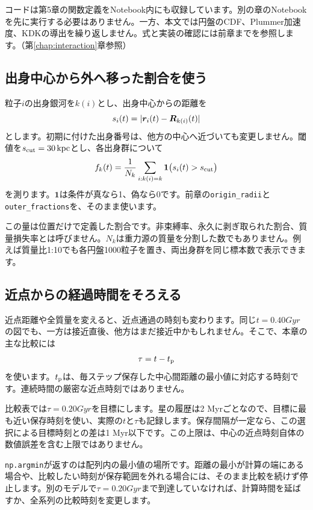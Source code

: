 コードは第5章の関数定義をNotebook内にも収録しています。別の章のNotebookを先に実行する必要はありません。一方、本文では円盤のCDF、Plummer加速度、KDKの導出を繰り返しません。式と実装の確認には前章までを参照します。（第\ref{chap:interaction}章参照）

\subsection{出身中心から外へ移った割合を使う}
粒子$i$の出身銀河を$k(i)$とし、出身中心からの距離を
\begin{equation}
 s_i(t)=|\boldsymbol r_i(t)-\boldsymbol R_{k(i)}(t)|
 \label{eq:ch6-origin-radius}
\end{equation}
とします。初期に付けた出身番号は、他方の中心へ近づいても変更しません。閾値を$s_{\rm cut}=30\,\mathrm{kpc}$とし、各出身群について
\begin{equation}
 f_k(t)=\frac{1}{N_k}\sum_{i:k(i)=k}\mathbf{1}\bigl(s_i(t)>s_{\rm cut}\bigr)
 \label{eq:ch6-fraction}
\end{equation}
を測ります。$\mathbf{1}$は条件が真なら1、偽なら0です。前章の\texttt{origin\_radii}と\texttt{outer\_fractions}を、そのまま使います。

この量は位置だけで定義した割合です。非束縛率、永久に剥ぎ取られた割合、質量損失率とは呼びません。$N_k$は重力源の質量を分割した数でもありません。例えば質量比1:10でも各円盤1000粒子を置き、両出身群を同じ標本数で表示できます。

\subsection{近点からの経過時間をそろえる}
近点距離や全質量を変えると、近点通過の時刻も変わります。同じ$t=0.40\unit{Gyr}$の図でも、一方は接近直後、他方はまだ接近中かもしれません。そこで、本章の主な比較には
\begin{equation}
 \tau=t-t_{\rm p}
 \label{eq:ch6-aligned-time}
\end{equation}
を使います。$t_{\rm p}$は、毎ステップ保存した中心間距離の最小値に対応する時刻です。連続時間の厳密な近点時刻ではありません。

比較表では$\tau=0.20\unit{Gyr}$を目標にします。星の履歴は2 Myrごとなので、目標に最も近い保存時刻を使い、実際の$t$と$\tau$も記録します。保存間隔が一定なら、この選択による目標時刻との差は1 Myr以下です。この上限は、中心の近点時刻自体の数値誤差を含む上限ではありません。

\texttt{np.argmin}が返すのは配列内の最小値の場所です。距離の最小が計算の端にある場合や、比較したい時刻が保存範囲を外れる場合には、そのまま比較を続けず停止します。別のモデルで$\tau=0.20\unit{Gyr}$まで到達していなければ、計算時間を延ばすか、全系列の比較時刻を変更します。



